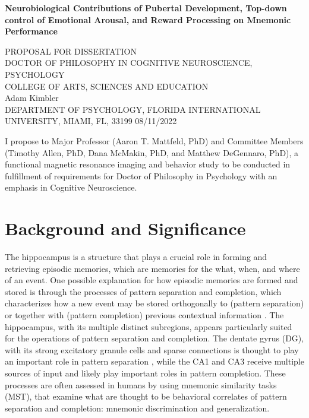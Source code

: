 \documentclass[11pt]{article}
\providecommand\citep{\cite}
\begin{document}
\author{Adam Kimbler}

\begin{titlepage}
    \begin{center}
        \textbf{Neurobiological Contributions of Pubertal Development, Top-down control
            of Emotional Arousal, and Reward Processing on Mnemonic Performance}

        \vspace{0.8cm}
        PROPOSAL FOR DISSERTATION\\
        DOCTOR OF PHILOSOPHY IN COGNITIVE NEUROSCIENCE, PSYCHOLOGY\\
        COLLEGE OF ARTS, SCIENCES AND EDUCATION\\
        \vspace{0.8cm}
        Adam Kimbler\\
        DEPARTMENT OF PSYCHOLOGY, FLORIDA INTERNATIONAL UNIVERSITY, MIAMI, FL, 33199
        08/11/2022
    \end{center}
    \vspace*{\fill}
    I propose to Major Professor (Aaron T. Mattfeld, PhD) and Committee Members
    (Timothy Allen, PhD, Dana McMakin, PhD, and Matthew DeGennaro, PhD), a
    functional magnetic resonance imaging and behavior study to be conducted in
    fulfillment of requirements for Doctor of Philosophy in Psychology with an
    emphasis in Cognitive Neuroscience.
\end{titlepage}
\clearpage

\section*{Background and Significance}

The hippocampus is a structure that plays a crucial role in forming and retrieving
episodic memories, which are memories for the what, when, and where of an event. One
possible explanation for how episodic memories are formed and stored is through the
processes of pattern separation and completion, which characterizes how a new event may
be stored orthogonally to (pattern separation) or together with (pattern completion)
previous contextual information \citep{yassa_ability_2011}. The hippocampus, with its
multiple distinct subregions, appears particularly suited for the operations of pattern
separation and completion. The dentate gyrus (DG), with its strong excitatory granule
cells and sparse connections is thought to play an important role in pattern separation
\citep{treves_mammalian_dentate_2008,
mcnaughton_hippocampal_1987,blackstad_distribution_1970,swanson_autoradiographic_1978},
while the CA1
\citep{burke_shared_function_2018,bakker_pattern_2008,rolls_quantitative_2013,
bittner_conjunctive_2015} and CA3
\citep{Insausti_Amaral_2008,trevino_excitationinhibition_2011} receive multiple sources
of input and likely play important roles in pattern completion. These processes are
often assessed in humans by using mnemonic similarity tasks (MST), that examine what
are thought to be behavioral correlates of pattern separation and completion: mnemonic
discrimination and generalization. \par
\end{document}
